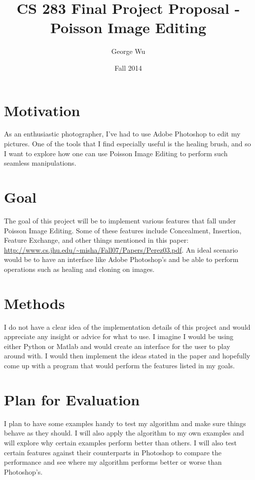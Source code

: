 \documentclass[12pt]{article}
\begin{document}
\title{CS 283 Final Project Proposal - Poisson Image Editing}
\date{Fall 2014}
\author{George Wu}

\maketitle

\section{Motivation}
As an enthusiastic photographer, I've had to use Adobe Photoshop to edit my pictures. One of the tools that I find especially useful is the healing brush, and so I want to explore how one can use Poisson Image Editing to perform such seamless manipulations. 

\section{Goal}
The goal of this project will be to implement various features that fall under Poisson Image Editing. Some of these features include Concealment, Insertion, Feature Exchange, and other things mentioned in this paper: \url{http://www.cs.jhu.edu/~misha/Fall07/Papers/Perez03.pdf}. An ideal scenario would be to have an interface like Adobe Photoshop's and be able to perform operations such as healing and cloning on images.

\section{Methods}
I do not have a clear idea of the implementation details of this project and would appreciate any insight or advice for what to use. I imagine I would be using either Python or Matlab and would create an interface for the user to play around with. I would then implement the ideas stated in the paper and hopefully come up with a program that would perform the features listed in my goals.

\section{Plan for Evaluation}
I plan to have some examples handy to test my algorithm and make sure things behave as they should. I will also apply the algorithm to my own examples and will explore why certain examples perform better than others. I will also test certain features against their counterparts in Photoshop to compare the performance and see where my algorithm performs better or worse than Photoshop's.
\end{document}
